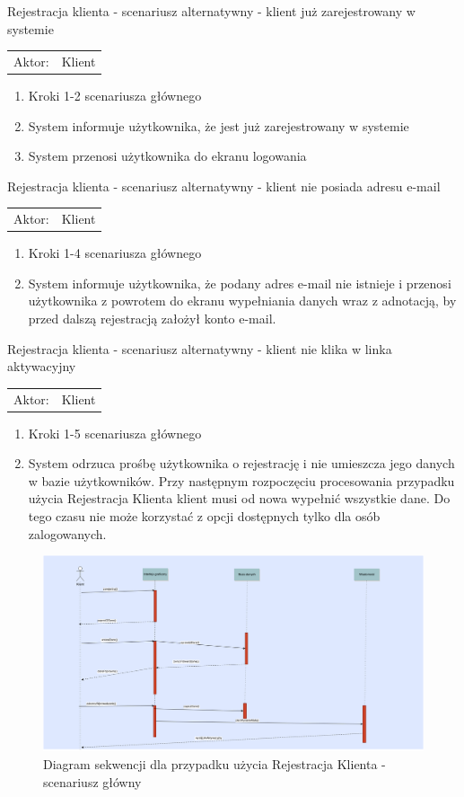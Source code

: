   
  \item Rejestracja klienta - scenariusz alternatywny - klient już
  zarejestrowany w systemie \\
  \begin{tabularx}{\linewidth}{ c X}
  Aktor: & Klient \\
  \end{tabularx}
   \begin{enumerate}
     \item Kroki 1-2 scenariusza głównego
     \item System informuje użytkownika, że jest już zarejestrowany w systemie
     \item System przenosi użytkownika do ekranu logowania
   \end{enumerate} 
   
   \item Rejestracja klienta - scenariusz alternatywny - klient nie posiada
   adresu e-mail
   \begin{tabularx}{\linewidth}{ c X}
	Aktor: & Klient \\
  	\end{tabularx}   
  	\begin{enumerate}
  	  \item Kroki 1-4 scenariusza głównego
  	  \item System informuje użytkownika, że podany adres e-mail nie istnieje i
  	  przenosi użytkownika z powrotem do ekranu wypełniania danych wraz z
  	  adnotacją, by przed dalszą rejestracją założył konto e-mail.
  	\end{enumerate}
  	
  	
\item Rejestracja klienta - scenariusz alternatywny - klient nie klika w linka
aktywacyjny
   \begin{tabularx}{\linewidth}{ c X}
	Aktor: & Klient \\
  	\end{tabularx}   
  	\begin{enumerate}
  	  \item Kroki 1-5 scenariusza głównego
  	  \item System odrzuca prośbę użytkownika o rejestrację i nie umieszcza jego
  	  danych w bazie użytkowników. Przy następnym rozpoczęciu procesowania
  	  przypadku użycia Rejestracja Klienta klient musi od nowa wypełnić wszystkie
  	  dane. Do tego czasu nie może korzystać z opcji dostępnych tylko dla osób
  	  zalogowanych.
  	\end{enumerate}
  	
  	
  	
\begin{figure}[H]
    \includegraphics[width=\textwidth,
    height=0.5\textheight]{graphics/UseCase/Klient/RejestracjaKlientaSD.png}
  \caption{Diagram sekwencji dla przypadku użycia Rejestracja Klienta -
  scenariusz główny}
\end{figure}